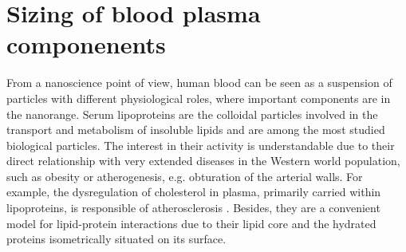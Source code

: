



\section{Sizing of blood plasma componenents}
\label{sec:lipoprotein_continuous}

From a nanoscience point of view, human blood can be seen as a suspension of particles with different physiological roles, where important components are in the nanorange. Serum lipoproteins are the colloidal particles involved in the transport and metabolism of insoluble lipids and are among the most studied biological particles. The interest in their activity is understandable due to their direct relationship with very extended diseases in the Western world population, such as obesity or atherogenesis, e.g. obturation of the arterial walls. For example, the dysregulation of cholesterol in plasma, primarily carried within lipoproteins, is responsible of atherosclerosis \citep{munro_pathogenesis_1988}. Besides, they are a convenient model for lipid-protein interactions \citep{assmann_lipid-protein_1974} due to their lipid core and the hydrated proteins isometrically situated on its surface.

